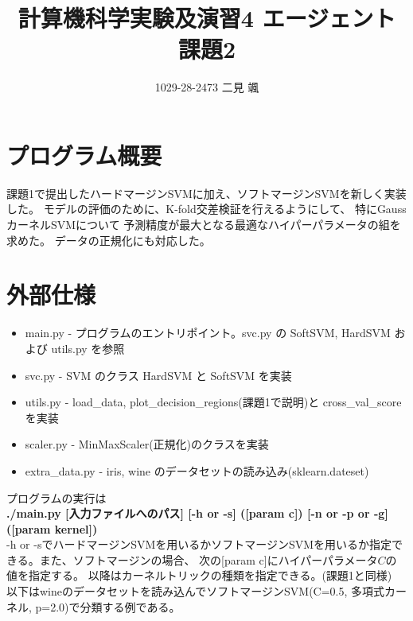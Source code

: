 \documentclass{jsarticle}
\begin{document}
\title{計算機科学実験及演習4 エージェント 課題2}
\author{1029-28-2473 二見 颯}
\maketitle

\section{プログラム概要}
課題1で提出したハードマージンSVMに加え、ソフトマージンSVMを新しく実装した。
モデルの評価のために、K-fold交差検証を行えるようにして、
特にGaussカーネルSVMについて
予測精度が最大となる最適なハイパーパラメータの組を求めた。
データの正規化にも対応した。

\section{外部仕様}
\begin{itemize}
    \item main.py - プログラムのエントリポイント。svc.py の SoftSVM, HardSVM および utils.py を参照
    \item svc.py - SVM のクラス HardSVM と SoftSVM を実装
    \item utils.py - load\_data, plot\_decision\_regions(課題1で説明)と cross\_val\_score を実装
    \item scaler.py - MinMaxScaler(正規化)のクラスを実装
    \item extra\_data.py - iris, wine のデータセットの読み込み(sklearn.dateset)
\end{itemize}
プログラムの実行は \\
{\bf ./main.py [入力ファイルへのパス] [-h or -s] ([param c]) [-n or -p or -g] ([param kernel])} \\ 
-h or -sでハードマージンSVMを用いるかソフトマージンSVMを用いるか指定できる。また、ソフトマージンの場合、
次の[param c]にハイパーパラメータ$C$の値を指定する。
以降はカーネルトリックの種類を指定できる。(課題1と同様) \\
以下はwineのデータセットを読み込んでソフトマージンSVM(C=0.5, 多項式カーネル, p=2.0)で分類する例である。
\end{document}
